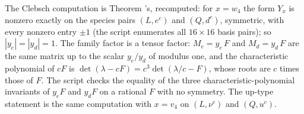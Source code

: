 The Clebsch computation is Theorem 's, recomputed: for $x = w_{4}$ the form $Y_{x}$ is nonzero exactly on the species pairs $(L, e^{c})$ and $(Q, d^{c})$, symmetric, with every nonzero entry $\pm 1$ (the script enumerates all $16 \times 16$ basis pairs); so $|y_{e}| = |y_{d}| = 1$. The family factor is a tensor factor: $M_{e} = y_{e}\,F$ and $M_{d} = y_{d}\,F$ are the same matrix up to the scalar $y_{e}/y_{d}$ of modulus one, and the characteristic polynomial of $cF$ is $\det(\lambda - cF) = c^{3}\det(\lambda/c - F)$, whose roots are $c$ times those of $F$. The script checks the equality of the three characteristic-polynomial invariants of $y_{e}F$ and $y_{d}F$ on a rational $F$ with no symmetry. The up-type statement is the same computation with $x = v_{4}$ on $(L, \nu^{c})$ and $(Q, u^{c})$.
